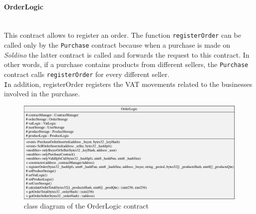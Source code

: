\paragraph{OrderLogic}\mbox{}\\

\noindent This contract allows to register an order. The function \texttt{registerOrder} can be called only by the \texttt{Purchase} contract because when a purchase is made on \textit{Soldino} the latter contract is called and forwards the request to this contract. In other words, if a purchase contains products from different sellers, the \texttt{Purchase} contract calls \texttt{registerOrder} for every different seller. \\
\texttt In addition, {registerOrder}  registers the VAT movements related to the businesses involved in the purchase.
\begin{figure}[H]
	\centering
	\includegraphics[scale=0.25]{res/images/solidity/orderlogic.png}
	\caption{class diagram of the OrderLogic contract}
\end{figure}